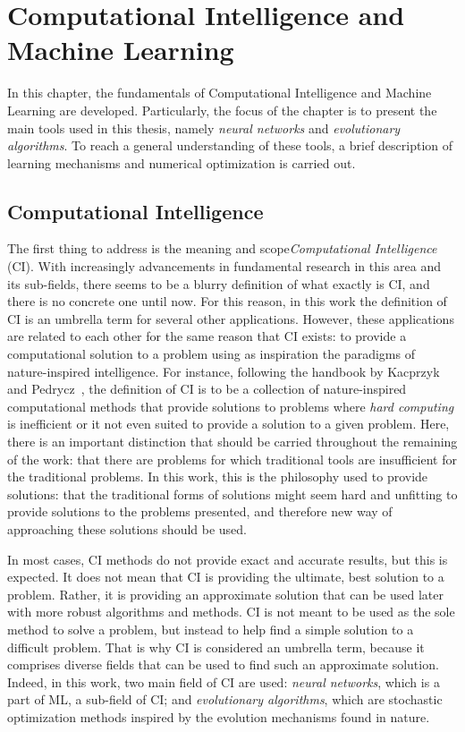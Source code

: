 \chapter{Computational Intelligence and Machine Learning}
\label{Cap3}

In this chapter, the fundamentals of Computational Intelligence and Machine Learning 
are developed. Particularly, the focus of the chapter is to present the main tools 
used in this thesis, namely \emph{neural networks} and \emph{evolutionary algorithms}. To 
reach a general understanding of these tools, a brief description of learning mechanisms
and numerical optimization is carried out.

\section{Computational Intelligence}
The first thing to address is the meaning and scope\emph{Computational 
Intelligence} (CI). With increasingly advancements in fundamental research in this area
and its sub-fields, there seems to be a blurry definition of what exactly is CI, and there 
is no concrete one until now. For this reason, in this work the definition of CI is an 
umbrella term for several other applications. However, these applications are related to 
each other for the same reason that CI exists: to provide a computational solution to a 
problem using as inspiration the paradigms of nature-inspired intelligence. For instance, 
following the handbook by Kacprzyk and 
Pedrycz~\cite{kacprzykSpringerHandbookComputational2015},
the definition of CI is to be a collection of nature-inspired computational methods that
provide solutions to problems where \emph{hard computing} is inefficient or it not even
suited to provide a solution to a given problem. Here, there is an important distinction
that should be carried throughout the remaining of the work: that there are problems for
which traditional tools are insufficient for the traditional problems. In this work, this
is the philosophy used to provide solutions: that the traditional forms of solutions might
seem hard and unfitting to provide solutions to the problems presented, and therefore
new way of approaching these solutions should be used.

In most cases, CI methods do not provide exact and accurate results, but this is expected.
It does not mean that CI is providing the ultimate, best solution to a problem. Rather, it 
is providing an approximate solution that can be used later with more robust algorithms and
methods. CI is not meant to be used as the sole method to solve a problem, but instead to
help find a simple solution to a difficult problem. That is why CI is considered an 
umbrella term, because it comprises diverse fields that can be used to find such an 
approximate solution. Indeed, in this work, two main field of CI are used:
\emph{neural networks}, which is a part of ML, a sub-field of CI; and
\emph{evolutionary algorithms}, which are stochastic optimization methods inspired by the 
evolution mechanisms found in nature.

